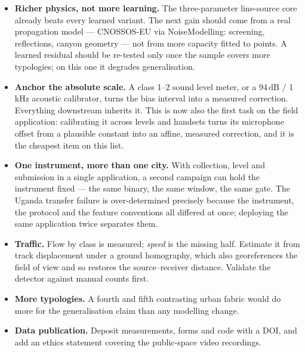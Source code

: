 \documentclass[11pt,a4paper]{article}
\newcommand{\dB}{\ensuremath{\,\mathrm{dB}}}
\begin{document}
\begin{itemize}
  \item \textbf{Richer physics, not more learning.} The three-parameter
        line-source core already beats every learned variant. The next gain
        should come from a real propagation model --- CNOSSOS-EU via
        NoiseModelling: screening, reflections, canyon geometry --- not from more
        capacity fitted to \nMeas{} points. A learned residual should be
        re-tested only once the sample covers more typologies; on this one it
        degrades generalisation.

  \item \textbf{Anchor the absolute scale.} A class 1--2 sound level meter, or a
        94\dB{} / 1\,kHz acoustic calibrator, turns the bias interval into a
        measured correction. Everything downstream inherits it. This is now also
        the first task on the field application: calibrating it across levels and
        handsets turns its microphone offset from a plausible constant into an
        affine, measured correction, and it is the cheapest item on this list.

  \item \textbf{One instrument, more than one city.} With collection, level and
        submission in a single application, a second campaign can hold the
        instrument fixed --- the same binary, the same window, the same gate.
        The Uganda transfer failure is over-determined precisely because the
        instrument, the protocol and the feature conventions all differed at
        once; deploying the same application twice separates them.

  \item \textbf{Traffic.} Flow by class is measured; \emph{speed} is the missing
        half. Estimate it from track displacement under a ground homography,
        which also georeferences the field of view and so restores the
        source--receiver distance. Validate the detector against manual counts
        first.

  \item \textbf{More typologies.} A fourth and fifth contrasting urban fabric
        would do more for the generalisation claim than any modelling change.

  \item \textbf{Data publication.} Deposit measurements, forms and code with a
        DOI, and add an ethics statement covering the public-space video
        recordings.
\end{itemize}
\end{document}
